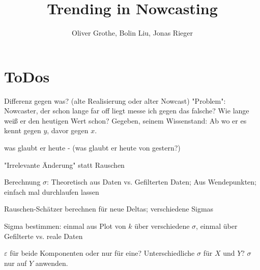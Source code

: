 \documentclass{article}
\title{Trending in Nowcasting}
\author{Oliver Grothe, Bolin Liu, Jonas Rieger}
\theoremstyle{plain}%
\theoremstyle{definition}
\begin{document}
\maketitle


\section{ToDos}


\begin{todolist}
\item Differenz gegen was? (alte Realisierung oder alter Nowcast) "Problem": Nowcaster, der schon lange far off liegt messe ich gegen das falsche? Wie lange weiß er den heutigen Wert schon? Gegeben, seinem Wissenstand: Ab wo er es kennt gegen $y$, davor gegen $x$.
\item was glaubt er heute - (was glaubt er heute von gestern?)
\item "Irrelevante Änderung" statt Rauschen
\item Berechnung $\sigma$: Theoretisch aus Daten vs. Gefilterten Daten; Aus Wendepunkten; einfach mal durchlaufen lassen
\item Rauschen-Schätzer berechnen für neue Deltas; verschiedene Sigmas
\item Sigma bestimmen: einmal aus Plot von $k$ über verschiedene $\sigma$, einmal über Gefilterte vs. reale Daten
\item $\varepsilon$ für beide Komponenten oder nur für eine? Unterschiedliche $\sigma$ für $X$ und $Y$? $\sigma$ nur auf $Y$ anwenden.
\end{todolist}



\end{document}
